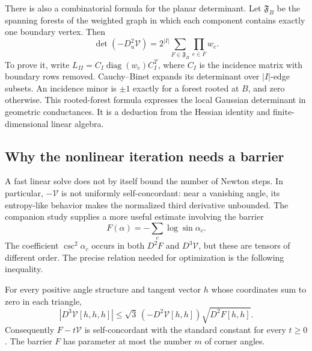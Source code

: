 There is also a combinatorial formula for the planar determinant. Let
$\mathfrak F_B$ be the spanning forests of the weighted graph in which
each component contains exactly one boundary vertex. Then
\begin{equation}
 \boxed{\det(-D_u^2\mathcal V)
      =2^{|I|}\sum_{F\in\mathfrak F_B}\prod_{e\in F}w_e.}
 \label{eq:ipolyForestDeterminant}
\end{equation}
To prove it, write $L_{II}=C_I\operatorname{diag}(w_e)C_I^T$, where
$C_I$ is the incidence matrix with boundary rows removed. Cauchy--Binet
expands its determinant over $|I|$-edge subsets. An incidence minor is
$\pm1$ exactly for a forest rooted at $B$, and zero otherwise. This
rooted-forest formula expresses the local Gaussian determinant in
geometric conductances. It is a deduction from the Hessian identity
and finite-dimensional linear algebra.

\subsection{Why the nonlinear iteration needs a barrier}

A fast linear solve does not by itself bound the number of Newton
steps. In particular, $-\mathcal V$ is not uniformly self-concordant:
near a vanishing angle, its entropy-like behavior makes the normalized
third derivative unbounded. The companion study supplies a more useful
estimate involving the barrier
\begin{equation}
 F(\alpha)=-\sum_c\log\sin\alpha_c.
 \label{eq:ipolyBarrier}
\end{equation}
The coefficient $\csc^2\alpha_c$ occurs in both $D^2F$ and
$D^3\mathcal V$, but these are tensors of different order. The precise
relation needed for optimization is the following inequality.

\begin{proposition}
\label{prop:ipolyCompatibility}
For every positive angle structure and tangent vector $h$ whose
coordinates sum to zero in each triangle,
\begin{equation}
 |D^3\mathcal V[h,h,h]|
 \le\sqrt3\,(-D^2\mathcal V[h,h])\sqrt{D^2F[h,h]}.
 \label{eq:ipolyCompatibility}
\end{equation}
Consequently $F-t\mathcal V$ is self-concordant with the standard
constant for every $t\ge0$. The barrier $F$ has parameter at most
the number $m$ of corner angles.
\end{proposition}

